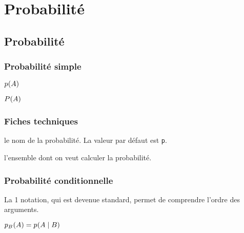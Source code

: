 \documentclass[12pt,a4paper]{article}
\begin{document}
\chapter{Probabilité}

\section{Probabilité}

\subsection{Probabilité \og simple \fg}

\newparaexample{}

\begin{latexex}
$\proba{A}$
\end{latexex}





\begin{latexex}
$\proba[P]{A}$
\end{latexex}




\subsection{Fiches techniques}


\IDoption{} le nom de la probabilité. La valeur par défaut est \verb+p+.

\IDarg{} l'ensemble dont on veut calculer la probabilité.




\subsection{Probabilité conditionnelle}


La 1\iere{} notation, qui est devenue standard, permet de comprendre l'ordre des arguments.
\begin{latexex}
 $\probacond {B}{A}
= \probacond*{B}{A}$
\end{latexex}




\end{document}
